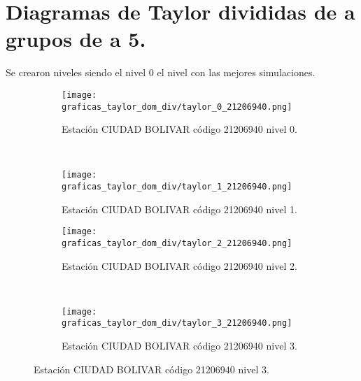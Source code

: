 
\chapter{Diagramas de Taylor divididas de a grupos de a 5.}
\label{anexo:diagramas_taylor_div_estaciones}

Se crearon niveles siendo el nivel 0 el nivel con las mejores simulaciones.



\begin{figure}[H]
    \centering
    
  
\begin{subfigure}[normla]{0.4\textwidth}
\texttt{[image: graficas\_taylor\_dom\_div/taylor\_0\_21206940.png]}
\caption{Estación CIUDAD BOLIVAR  código 21206940 nivel 0.}
\end{subfigure}
~
\begin{subfigure}[normla]{0.4\textwidth}
\texttt{[image: graficas\_taylor\_dom\_div/taylor\_1\_21206940.png]}
\caption{Estación CIUDAD BOLIVAR  código 21206940 nivel 1.}
\end{subfigure}

\begin{subfigure}[normla]{0.4\textwidth}
\texttt{[image: graficas\_taylor\_dom\_div/taylor\_2\_21206940.png]}
\caption{Estación CIUDAD BOLIVAR  código 21206940 nivel 2.}
\end{subfigure}
~
\begin{subfigure}[normla]{0.4\textwidth}
\texttt{[image: graficas\_taylor\_dom\_div/taylor\_3\_21206940.png]}
\caption{Estación CIUDAD BOLIVAR  código 21206940 nivel 3.}
\end{subfigure}

\end{figure}
           
